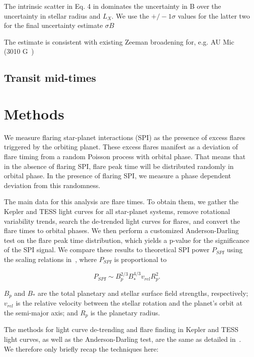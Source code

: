 \documentclass[twocolumn]{aastex631}
\begin{document}
The intrinsic scatter in Eq. 4 in \cite{reiners2022magnetism} dominates the uncertainty in B over the uncertainty in stellar radius and $L_X$. We use the $+/-1\sigma$ values for the latter two for the final uncertainty estimate $\sigma B$

The estimate is consistent with existing Zeeman broadening for, e.g. AU Mic (3010 G~\cite{reiners2022magnetism})
\subsection{Transit mid-times}

\section{Methods}
\label{sec:methods}
We measure flaring star-planet interactions (SPI) as the presence of excess flares triggered by the orbiting planet. These excess flares manifest as a deviation of flare timing from a random Poisson process with orbital phase. That means that in the absence of flaring SPI, flare peak time will be distributed randomly in orbital phase. In the presence of flaring SPI, we measure a phase dependent deviation from this randomness.

The main data for this analysis are flare times. To obtain them, we gather the Kepler and TESS light curves for all star-planet systems, remove rotational variability trends, search the de-trended light curves for flares, and convert the flare times to orbital phases. We then perform a customized Anderson-Darling test on the flare peak time distribution, which yields a p-value for the significance of the SPI signal. We compare these results to theoretical SPI power $P_{SPI}$ using the scaling relations in~\cite{lanza2012starplanet}, where $P_{SPI}$ is proportional to

\begin{equation}
    P_{SPI} \sim B_p^{2/3} B_*^{4/3} v_{rel} R_p^2.
\end{equation}

$B_p$ and $B_*$ are the total planetary and stellar surface field strengths, respectively; $v_{rel}$ is the relative velocity between the stellar rotation and the planet's orbit at the semi-major axis; and $R_p$ is the planetary radius.


The methods for light curve de-trending and flare finding in Kepler and TESS light curves, as well as the Anderson-Darling test, are the same as detailed in~\citep{ilin2022searching}. We therefore only briefly recap the techniques here:
\end{document}
